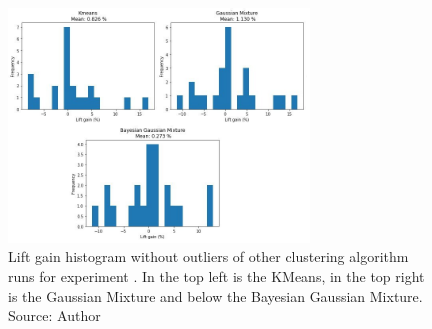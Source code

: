 \begin{figure}[h]
   \centering
   \includegraphics[width=8cm]{fig/ch4-other-cluster-algo.png}
   \caption{Lift gain histogram without outliers of other clustering algorithm runs for experiment \nameExperimentII{}. In the top left is the KMeans, in the top right is the Gaussian Mixture and below the Bayesian Gaussian Mixture. Source: Author}
   \label{fig:other-cluster-algo}
\end{figure}
 
